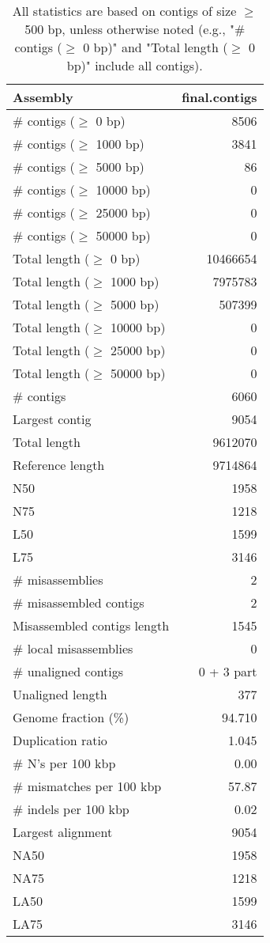 \documentclass[12pt,a4paper]{article}
\begin{document}
\begin{table}[ht]
\begin{center}
\caption{All statistics are based on contigs of size $\geq$ 500 bp, unless otherwise noted (e.g., "\# contigs ($\geq$ 0 bp)" and "Total length ($\geq$ 0 bp)" include all contigs).}
\begin{tabular}{|l*{1}{|r}|}
\hline
Assembly & final.contigs \\ \hline
\# contigs ($\geq$ 0 bp) & 8506 \\ \hline
\# contigs ($\geq$ 1000 bp) & 3841 \\ \hline
\# contigs ($\geq$ 5000 bp) & 86 \\ \hline
\# contigs ($\geq$ 10000 bp) & 0 \\ \hline
\# contigs ($\geq$ 25000 bp) & 0 \\ \hline
\# contigs ($\geq$ 50000 bp) & 0 \\ \hline
Total length ($\geq$ 0 bp) & 10466654 \\ \hline
Total length ($\geq$ 1000 bp) & 7975783 \\ \hline
Total length ($\geq$ 5000 bp) & 507399 \\ \hline
Total length ($\geq$ 10000 bp) & 0 \\ \hline
Total length ($\geq$ 25000 bp) & 0 \\ \hline
Total length ($\geq$ 50000 bp) & 0 \\ \hline
\# contigs & 6060 \\ \hline
Largest contig & 9054 \\ \hline
Total length & 9612070 \\ \hline
Reference length & 9714864 \\ \hline
N50 & 1958 \\ \hline
N75 & 1218 \\ \hline
L50 & 1599 \\ \hline
L75 & 3146 \\ \hline
\# misassemblies & 2 \\ \hline
\# misassembled contigs & 2 \\ \hline
Misassembled contigs length & 1545 \\ \hline
\# local misassemblies & 0 \\ \hline
\# unaligned contigs & 0 + 3 part \\ \hline
Unaligned length & 377 \\ \hline
Genome fraction (\%) & 94.710 \\ \hline
Duplication ratio & 1.045 \\ \hline
\# N's per 100 kbp & 0.00 \\ \hline
\# mismatches per 100 kbp & 57.87 \\ \hline
\# indels per 100 kbp & 0.02 \\ \hline
Largest alignment & 9054 \\ \hline
NA50 & 1958 \\ \hline
NA75 & 1218 \\ \hline
LA50 & 1599 \\ \hline
LA75 & 3146 \\ \hline
\end{tabular}
\end{center}
\end{table}
\end{document}
